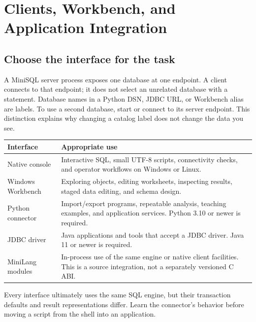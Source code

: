 \chapter{Clients, Workbench, and Application Integration}
\label{adv:clients}

\section{Choose the interface for the task}

A MiniSQL server process exposes one database at one endpoint. A client connects to that endpoint; it does not select an unrelated database with a  statement. Database names in a Python DSN, JDBC URL, or Workbench alias are labels. To use a second database, start or connect to its server endpoint. This distinction explains why changing a catalog label does not change the data you see.

\begin{longtable}{p{.23\linewidth}p{.68\linewidth}}
\toprule Interface & Appropriate use \\\midrule
Native console & Interactive SQL, small UTF-8 scripts, connectivity checks, and operator workflows on Windows or Linux. \\
Windows Workbench & Exploring objects, editing worksheets, inspecting results, staged data editing, and schema design. \\
Python connector & Import/export programs, repeatable analysis, teaching examples, and application services. Python 3.10 or newer is required. \\
JDBC driver & Java applications and tools that accept a JDBC driver. Java 11 or newer is required. \\
MiniLang modules & In-process use of the same engine or native client facilities. This is a source integration, not a separately versioned C ABI. \\
\bottomrule
\end{longtable}

Every interface ultimately uses the same SQL engine, but their transaction defaults and result representations differ. Learn the connector's behavior before moving a script from the shell into an application.

